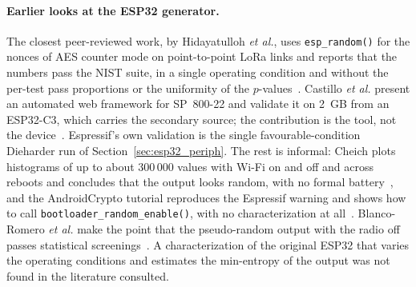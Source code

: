 \paragraph{Earlier looks at the ESP32 generator.} The closest
peer-reviewed work, by Hidayatulloh \emph{et al.}, uses
\texttt{esp\_\allowbreak{}random()} for the nonces of AES counter mode on point-to-point
LoRa links and reports that the numbers pass the NIST suite, in a single
operating condition and without the per-test pass proportions or the
uniformity of the $p$-values~\cite{hidayatulloh_2024_performance}. Castillo
\emph{et al.} present an automated web framework for SP~800-22 and
validate it on 2~GB from an ESP32-C3, which carries the secondary source;
the contribution is the tool, not the device~\cite{castillo_2026_automated}.
Espressif's own validation is the single favourable-condition Dieharder run
of Section~\ref{sec:esp32_periph}. The rest is informal: Cheich plots
histograms of up to about 300\,000 values with Wi-Fi on and off and across
reboots and concludes that the output looks random, with no formal
battery~\cite{cheich_2025_esp32}, and the AndroidCrypto tutorial reproduces
the Espressif warning and shows how to call
\texttt{bootloader\_\allowbreak{}random\_\allowbreak{}enable()}, with no characterization at
all~\cite{androidcrypto_esp32}. Blanco-Romero \emph{et al.} make the
point that the pseudo-random output with the radio off passes statistical
screenings~\cite{blancoromero_2026_entropy}. A characterization of the
original ESP32 that varies the operating conditions and estimates the
min-entropy of the output was not found in the literature consulted.

